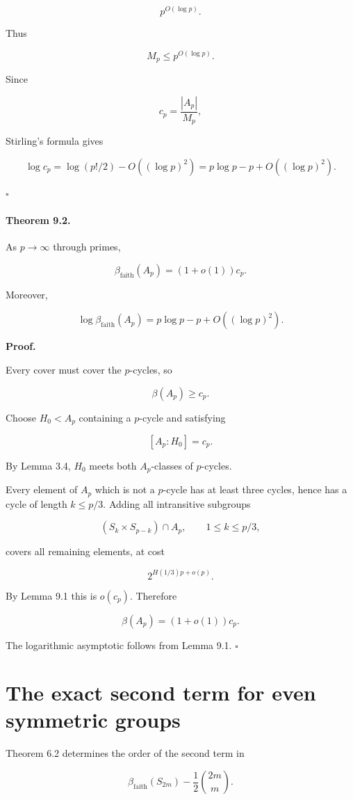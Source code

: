 \documentclass[11pt]{article}
\begin{document}
\[
p^{O(\log p)}.
\]

Thus

\[
M_p\le p^{O(\log p)}.
\]

Since

\[
c_p=\frac{|A_p|}{M_p},
\]

Stirling's formula gives

\[
\log c_p
=
\log(p!/2)-O((\log p)^2)
=
p\log p-p+O((\log p)^2).
\]

$\square$

\paragraph{Theorem 9.2.}

As $p\to\infty$ through primes,

\[
\beta_{\mathrm{faith}}(A_p)=(1+o(1))c_p.
\]

Moreover,

\[
\log\beta_{\mathrm{faith}}(A_p)
=
p\log p-p+O((\log p)^2).
\]

\noindent\textbf{Proof.}

Every cover must cover the $p$-cycles, so

\[
\beta(A_p)\ge c_p.
\]

Choose $H_0<A_p$ containing a $p$-cycle and satisfying

\[
[A_p:H_0]=c_p.
\]

By Lemma 3.4, $H_0$ meets both $A_p$-classes of $p$-cycles.

Every element of $A_p$ which is not a $p$-cycle has at least three cycles, hence has a cycle of length $k\le p/3$. Adding all intransitive subgroups

\[
(S_k\times S_{p-k})\cap A_p,
\qquad
1\le k\le p/3,
\]

covers all remaining elements, at cost

\[
2^{H(1/3)p+o(p)}.
\]

By Lemma 9.1 this is $o(c_p)$. Therefore

\[
\beta(A_p)=(1+o(1))c_p.
\]

The logarithmic asymptotic follows from Lemma 9.1. $\square$

\section{The exact second term for even symmetric groups}

Theorem 6.2 determines the order of the second term in

\[
\beta_{\mathrm{faith}}(S_{2m})
-
\frac12\binom{2m}{m}.
\]
\end{document}
